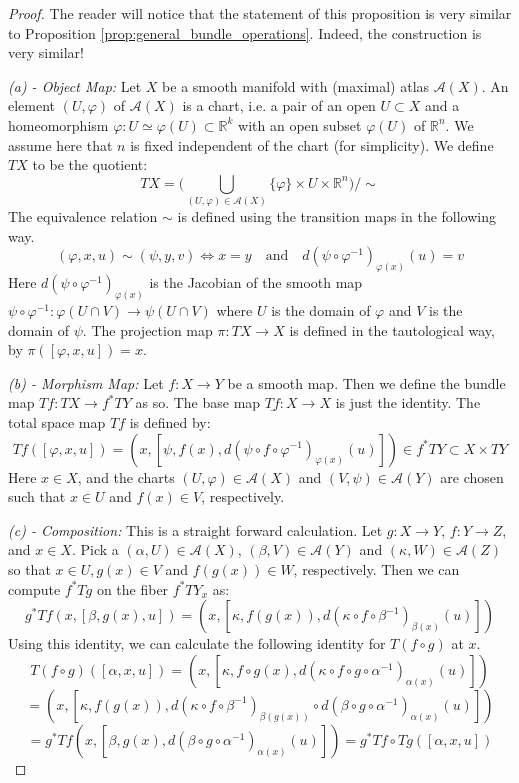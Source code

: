 \documentclass[12pt]{article}
\theoremstyle{definition}
\numberwithin{equation}{section}
\newcommand{\R}{{\mathbb R}}
\begin{document}
\begin{proof} The reader will notice that the statement of this proposition is very similar to Proposition \ref{prop:general_bundle_operations}. Indeed, the construction is very similar! 

\vspace{5pt}

\emph{(a) - Object Map:} Let $X$ be a smooth manifold with (maximal) atlas $\mathcal{A}(X)$. An element $(U,\varphi)$ of $\mathcal{A}(X)$ is a chart, i.e. a pair of an open $U \subset X$ and a homeomorphism $\varphi:U \simeq \varphi(U) \subset \R^k$ with an open subset $\varphi(U)$ of $\R^n$. We assume here that $n$ is fixed independent of the chart (for simplicity). We define $TX$ to be the quotient:
\[
TX = \big(\bigcup_{(U,\varphi) \in \mathcal{A}(X)} \{\varphi\} \times U \times \R^n\big)\big/\sim
\]
The equivalence relation $\sim$ is defined using the transition maps in the following way.
\[(\varphi,x,u) \sim (\psi,y,v) \iff x = y \quad \text{and} \quad d(\psi \circ \varphi^{-1})_{\varphi(x)}(u) = v\]
Here $d(\psi \circ \varphi^{-1})_{\varphi(x)}$ is the Jacobian of the smooth map $\psi \circ \varphi^{-1}:\varphi(U \cap V) \to \psi(U \cap V)$ where $U$ is the domain of $\varphi$ and $V$ is the domain of $\psi$. The projection map $\pi:TX \to X$ is defined in the tautological way, by $\pi([\varphi,x,u]) = x$.

\vspace{5pt}

\emph{(b) - Morphism Map:} Let $f:X \to Y$ be a smooth map. Then we define the bundle map $Tf:TX \to f^*TY$ as so. The base map $\underline{Tf}:X \to X$ is just the identity. The total space map $Tf$ is defined by:
\[
Tf([\varphi,x,u]) = (x,[\psi,f(x),d(\psi \circ f \circ \varphi^{-1})_{\varphi(x)}(u)]) \in f^*TY \subset X \times TY
\]
Here $x \in X$, and the charts $(U,\varphi) \in \mathcal{A}(X)$ and $(V,\psi) \in \mathcal{A}(Y)$ are chosen such that $x \in U$ and $f(x) \in V$, respectively.

\vspace{5pt} 

\emph{(c) - Composition:} This is a straight forward calculation. Let $g:X \to Y$, $f:Y \to Z$, and $x \in X$. Pick a $(\alpha,U) \in \mathcal{A}(X)$, $(\beta,V) \in \mathcal{A}(Y)$ and $(\kappa,W) \in \mathcal{A}(Z)$ so that $x \in U, g(x) \in V$ and $f(g(x)) \in W$, respectively. Then we can compute $f^*Tg$ on the fiber $f^*TY_x$ as:
\[g^*Tf(x,[\beta,g(x),u]) = (x,[\kappa,f(g(x)),d(\kappa \circ f \circ \beta^{-1})_{\beta(x)}(u)])\]
Using this identity, we can calculate the following identity for $T(f \circ g)$ at $x$.
\[T(f \circ g)([\alpha,x,u]) = (x,[\kappa,f \circ g(x), d(\kappa \circ f \circ g \circ \alpha^{-1})_{\alpha(x)}(u)])\]
\[ = (x,[\kappa,f(g(x)),d(\kappa \circ f \circ \beta^{-1})_{\beta(g(x))} \circ d(\beta \circ g \circ \alpha^{-1})_{\alpha(x)}(u)])\]
\[ = g^*Tf(x,[\beta,g(x),d(\beta \circ g \circ \alpha^{-1})_{\alpha(x)}(u)]) = g^*Tf \circ Tg ([\alpha,x,u])\]


\end{proof}
\end{document}
